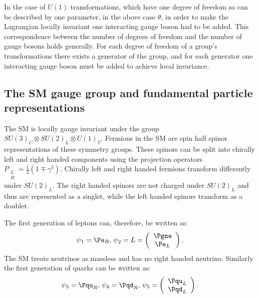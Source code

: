 In the case of $U(1)$ transformations, which have one degree of freedom so can be described by one parameter, in the above case $\theta$, in order to make the Lagrangian locally invariant one interacting gauge boson had to be added. This correspondence between the number of degrees of freedom and the number of gauge bosons holds generally. For each degree of freedom of a group's transformations there exists a generator of the group, and for each generator one interacting gauge boson must be added to achieve local invariance.

\subsection{The SM gauge group and fundamental particle representations}
\label{sec:smgauge}
The SM is locally gauge invariant under the group $SU\left(3\right)_{C}\otimes SU\left(2\right)_{L}\otimes U\left(1\right)_{Y}$. Fermions in the SM are spin half spinor representations of these symmetry groups. These spinors can be split into chirally left and right handed components using the projection operators $P_{\substack{L \\R}}=\frac{1}{2}(1\mp \gamma^{5})$. Chirally left and right handed fermions transform differently under $SU\left(2\right)_{L}$. The right handed spinors are not charged under $SU\left(2\right)_{L}$ and thus are represented as a singlet, while the left handed spinors transform as a doublet.

The first generation of leptons can, therefore, be written as:
\begin{equation}
  \psi_{1}=\Pe_{R},\,\psi_{2}=L=\left(\begin{array}{c} \Pgne \\ \Pe_{L}\end{array}\right).
\end{equation}
The SM treats neutrinos as massless and has no right handed neutrino. Similarly the first generation of quarks can be written as:
\begin{equation}
  \psi_{3}=\Pqu_{R},\,\psi_{4}=\Pqd_{R},\,\psi_{5}=\left(\begin{array}{c} \Pqu_{L} \\ \Pqd_{L}\end{array}\right).
\end{equation}

